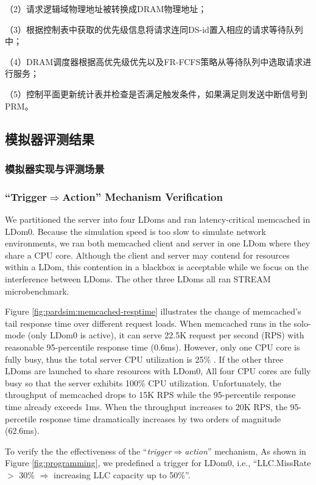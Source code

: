 （2）请求逻辑域物理地址被转换成DRAM物理地址；

（3）根据控制表中获取的优先级信息将请求连同DS-id置入相应的请求等待队列中；

（4）DRAM调度器根据高优先级优先以及FR-FCFS\cite{rixner_memory_2000}策略从等待队列中选取请求进行服务；

（5）控制平面更新统计表并检查是否满足触发条件，如果满足则发送中断信号到PRM。

\subsection{模拟器评测结果}

\subsubsection{模拟器实现与评测场景}

\subsubsection{``Trigger$\Rightarrow$Action'' Mechanism Verification}

We partitioned the server into four LDoms and ran latency-critical memcached
in LDom0. Because the simulation speed is too slow to simulate
network environments, we ran both memcached
client and server in one LDom where they share a CPU core. Although
the client and server may contend for resources within a LDom, this contention
in a blackbox is acceptable while we focus on the interference between LDoms.
The other three LDoms all ran STREAM microbenchmark.

Figure \ref{fig:pardsim:memcached-resptime} illustrates the change of
memcached's tail response time over different request loads.
When memcached runs in the solo-mode (only LDom0 is active),
it can serve 22.5K request per
second (RPS) with reasonable 95-percentile response time (0.6ms). However,
only one CPU core is fully busy, thus the total server CPU utilization is 25\% .
If the other three LDoms are launched to share resources with LDom0,
All four CPU cores are fully busy so that the server exhibits 100\% CPU utilization.
Unfortunately, the throughput of memcached drops to 15K RPS while
the 95-percentile response time already exceeds 1ms. When 
the throughput increases to 20K RPS, the 95-percetile response time
dramatically increases by two orders of magnitude (62.6ms). 

To verify the the effectiveness of the ``\emph{trigger$\Rightarrow$action}'' mechanism,
As shown in Figure \ref{fig:programming}, we predefined a trigger for LDom0, i.e.,
``LLC.MissRate $>$ 30\% $\Rightarrow$ increasing LLC capacity up to 50\%''.

